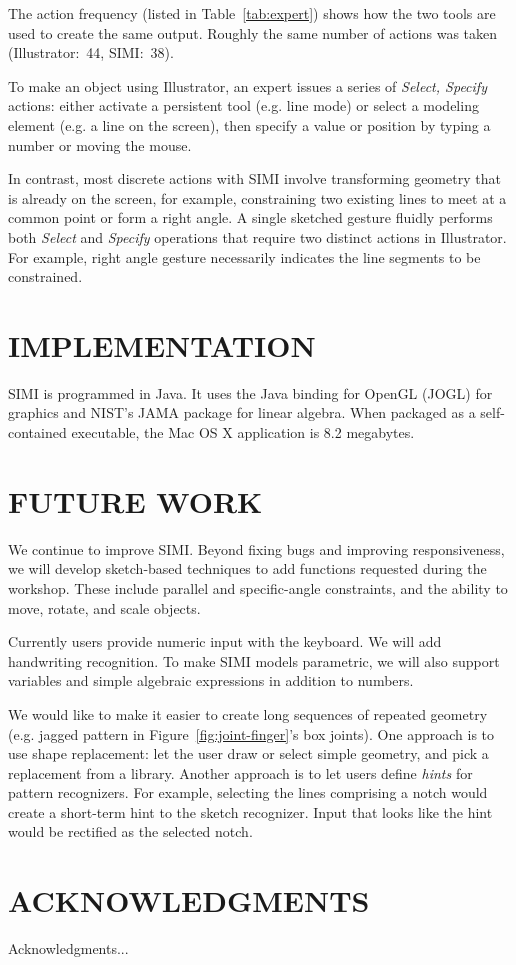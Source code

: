 \documentclass{article}
\begin{document}
The action frequency (listed in Table~\ref{tab:expert}) shows how the
two tools are used to create the same output. Roughly the same number
of actions was taken (Illustrator:~44, SIMI:~38).

To make an object using Illustrator, an expert issues a series of
\textit{Select, Specify} actions: either activate a persistent tool
(e.g. line mode) or select a modeling element (e.g. a line on the
screen), then specify a value or position by typing a number or moving
the mouse.

In contrast, most discrete actions with SIMI involve transforming
geometry that is already on the screen, for example, constraining two
existing lines to meet at a common point or form a right angle. A
single sketched gesture fluidly performs both \textit{Select} and
\textit{Specify} operations that require two distinct actions in
Illustrator. For example, right angle gesture necessarily indicates
the line segments to be constrained.

\section{IMPLEMENTATION}

SIMI is programmed in Java. It uses the Java binding for OpenGL (JOGL)
for graphics and NIST's JAMA package for linear algebra. When packaged
as a self-contained executable, the Mac OS X application is 8.2
megabytes.

\section{FUTURE WORK}

We continue to improve SIMI. Beyond fixing bugs and improving
responsiveness, we will develop sketch-based techniques to add
functions requested during the workshop. These include parallel and
specific-angle constraints, and the ability to move, rotate, and scale
objects.

Currently users provide numeric input with the keyboard. We will add
handwriting recognition. To make SIMI models parametric, we will also
support variables and simple algebraic expressions in addition to
numbers.

We would like to make it easier to create long sequences of repeated
geometry (e.g. jagged pattern in Figure~\ref{fig:joint-finger}'s box
joints). One approach is to use shape replacement: let the user draw
or select simple geometry, and pick a replacement from a
library. Another approach is to let users define \textit{hints} for
pattern recognizers. For example, selecting the lines comprising a
notch would create a short-term hint to the sketch recognizer. Input
that looks like the hint would be rectified as the selected notch.

\section{ACKNOWLEDGMENTS}


Acknowledgments...
\newpage


\end{document}
